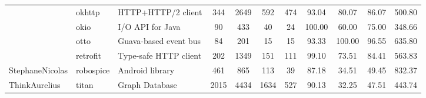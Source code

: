 \begin{table*}[]
{\begin{tabular}{lllcccccccc}
                            & okhttp                                                        & HTTP+HTTP/2 client                                                        & 344            & 2649            & 592                                                                   & 474            & 93.04          & 80.07          & 86.07          & 500.80                                               \\
                            & okio                                                          & I/O API for Java                                                          & 90             & 433             & 40                                                                    & 24             & 100.00         & 60.00          & 75.00          & 348.66                                               \\
                            & otto                                                          & Guava-based event bus                                                     & 84             & 201             & 15                                                                    & 15             & 93.33          & 100.00         & 96.55          & 635.80                                               \\
                            & retrofit                                                      & Type-safe HTTP client                                                     & 202            & 1349            & 151                                                                   & 111            & 99.10          & 73.51          & 84.41          & 563.83                                               \\ \hline
StephaneNicolas             & robospice                                                     & Android library                                                           & 461            & 865             & 113                                                                   & 39             & 87.18          & 34.51          & 49.45          & 832.37                                               \\ \hline
ThinkAurelius               & titan                                                         & Graph Database                                                            & 2015           & 4434            & 1634                                                                  & 527            & 90.13          & 32.25          & 47.51          & 443.74                                               \\ \hline

\end{tabular}}
\end{table*}
